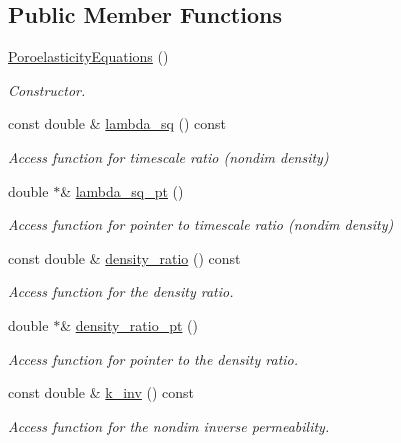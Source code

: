\subsection*{Public Member Functions}
\begin{DoxyCompactItemize}
\item 
\hyperlink{classoomph_1_1PoroelasticityEquations_aaed6a78df898d4b52f5da3454eed8267}{Poroelasticity\+Equations} ()
\begin{DoxyCompactList}\small\item\em Constructor. \end{DoxyCompactList}\item 
const double \& \hyperlink{classoomph_1_1PoroelasticityEquations_abf4d66cc18272c1c9cab2947f55a23e5}{lambda\+\_\+sq} () const
\begin{DoxyCompactList}\small\item\em Access function for timescale ratio (nondim density) \end{DoxyCompactList}\item 
double $\ast$\& \hyperlink{classoomph_1_1PoroelasticityEquations_a139020479ff89b89394cad32595abcff}{lambda\+\_\+sq\+\_\+pt} ()
\begin{DoxyCompactList}\small\item\em Access function for pointer to timescale ratio (nondim density) \end{DoxyCompactList}\item 
const double \& \hyperlink{classoomph_1_1PoroelasticityEquations_a7528e9d4b6ca649b862d9af496bc322b}{density\+\_\+ratio} () const
\begin{DoxyCompactList}\small\item\em Access function for the density ratio. \end{DoxyCompactList}\item 
double $\ast$\& \hyperlink{classoomph_1_1PoroelasticityEquations_aa9390a0dea4c4d791dac49f1b2a59de9}{density\+\_\+ratio\+\_\+pt} ()
\begin{DoxyCompactList}\small\item\em Access function for pointer to the density ratio. \end{DoxyCompactList}\item 
const double \& \hyperlink{classoomph_1_1PoroelasticityEquations_a2543a15dbefd2062f591e8257ac534b8}{k\+\_\+inv} () const
\begin{DoxyCompactList}\small\item\em Access function for the nondim inverse permeability. \end{DoxyCompactList}\item 

\end{DoxyCompactItemize}
